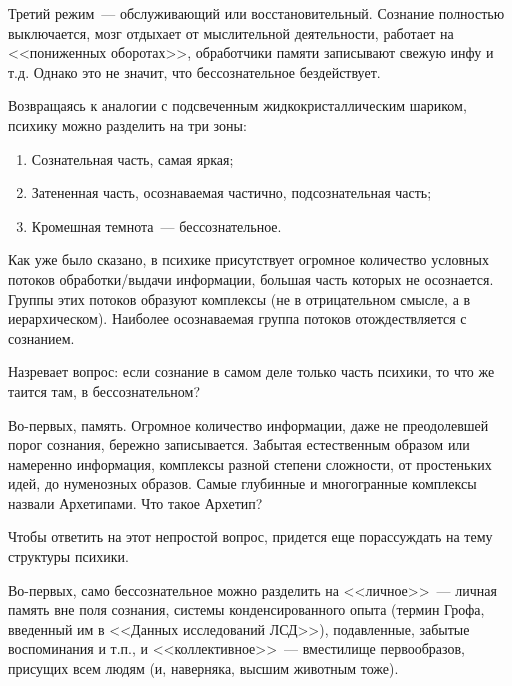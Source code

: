 \documentclass[a4paper,14pt,oneside]{memoir}
\begin{document}
Третий режим~--- обслуживающий или восстановительный. Сознание полностью выключается, мозг отдыхает от мыслительной деятельности, работает на <<пониженных оборотах>>, обработчики памяти записывают свежую инфу и т.д. Однако это не значит, что бессознательное бездействует.

Возвращаясь к аналогии с подсвеченным жидкокристаллическим шариком, психику можно разделить на три зоны:

\begin{enumerate}
\item Сознательная часть, самая яркая;
\item Затененная часть, осознаваемая частично, подсознательная часть;
\item Кромешная темнота~--- бессознательное.
\end{enumerate}

Как уже было сказано, в психике присутствует огромное количество условных потоков обработки/выдачи информации, большая часть которых не осознается. Группы этих потоков образуют комплексы (не в отрицательном смысле, а в иерархическом). Наиболее осознаваемая группа потоков отождествляется с сознанием.

Назревает вопрос: если сознание в самом деле только часть психики, то что же таится там, в бессознательном?

Во-первых, память. Огромное количество информации, даже не преодолевшей порог сознания, бережно записывается. Забытая естественным образом или намеренно информация, комплексы разной степени сложности, от простеньких идей, до нуменозных образов. Самые глубинные и многогранные комплексы назвали Архетипами. Что такое Архетип?

Чтобы ответить на этот непростой вопрос, придется еще порассуждать на тему структуры психики.

Во-первых, само бессознательное можно разделить на <<личное>>~--- личная память вне поля сознания, системы конденсированного опыта (термин Грофа, введенный им в <<Данных исследований ЛСД>>), подавленные, забытые воспоминания и т.п., и <<коллективное>>~--- вместилище первообразов, присущих всем людям (и, наверняка, высшим животным тоже).
\end{document}
